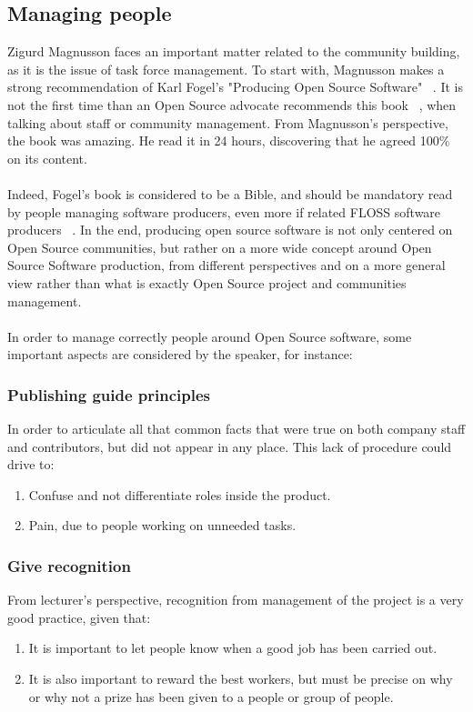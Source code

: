 \documentclass[11pt]{article}
\begin{document}
\subsection{Managing people}
  Zigurd Magnusson faces an important matter related to the community building, as it is the issue of task force management. To start with, Magnusson makes a strong recommendation of Karl Fogel's "Producing Open Source Software" ~\cite{FOGE00}. It is not the first time than an Open Source advocate recommends this book ~\cite{TALK01}, when talking about staff or community management. From Magnusson's perspective, the book was amazing. He read it in 24 hours, discovering that he agreed 100\% on its content.\\
\\
Indeed, Fogel's book is considered to be a Bible, and should be mandatory read by people managing software producers, even more if related FLOSS software producers ~\cite{TALK01}.  In the end, producing open source software is not only centered on Open Source communities, but rather on a more wide concept around Open Source Software production, from different perspectives and on a more general view rather than what is exactly Open Source project and communities management.\\
\\
In order to manage correctly people around Open Source software, some important aspects are considered by the speaker, for instance:

\subsubsection{Publishing guide principles}
In order to articulate all that common facts that were true on both company staff and contributors, but did not appear in any place. This lack of procedure could drive to:
\begin{enumerate}\itemsep0pt
\item{Confuse and not differentiate roles inside the product.}
\item{Pain, due to people working on unneeded tasks.}
\end{enumerate}

\subsubsection{Give recognition}
From lecturer's perspective, recognition from management of the project is a very good practice, given that:
\begin{enumerate}\itemsep0pt
\item{It is important to let people know when a good job has been carried out}.
\item{It is also important to reward the best workers, but must be precise on why or why not a prize has been given to a people or group of people}.
\end{enumerate}
\end{document}
